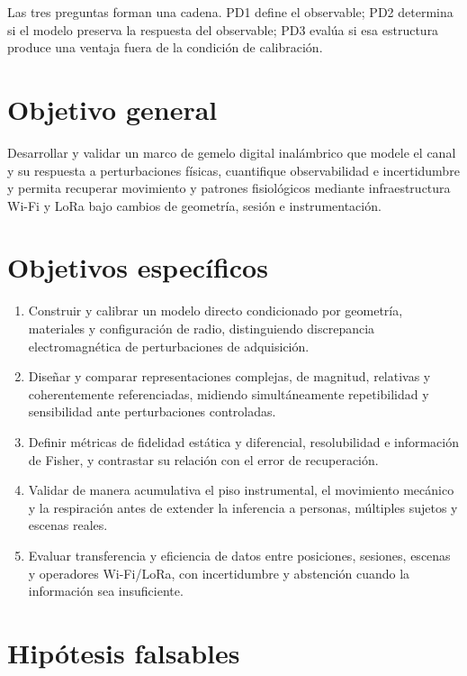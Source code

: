 Las tres preguntas forman una cadena. PD1 define el observable; PD2 determina si el modelo preserva la respuesta del observable; PD3 evalúa si esa estructura produce una ventaja fuera de la condición de calibración.

\section{Objetivo general}

Desarrollar y validar un marco de gemelo digital inalámbrico que modele el canal y su respuesta a perturbaciones físicas, cuantifique observabilidad e incertidumbre y permita recuperar movimiento y patrones fisiológicos mediante infraestructura Wi-Fi y LoRa bajo cambios de geometría, sesión e instrumentación.

\section{Objetivos específicos}

\begin{enumerate}[label=\textbf{O\arabic*:},leftmargin=3em]
\item Construir y calibrar un modelo directo condicionado por geometría, materiales y configuración de radio, distinguiendo discrepancia electromagnética de perturbaciones de adquisición.
\item Diseñar y comparar representaciones complejas, de magnitud, relativas y coherentemente referenciadas, midiendo simultáneamente repetibilidad y sensibilidad ante perturbaciones controladas.
\item Definir métricas de fidelidad estática y diferencial, resolubilidad e información de Fisher, y contrastar su relación con el error de recuperación.
\item Validar de manera acumulativa el piso instrumental, el movimiento mecánico y la respiración antes de extender la inferencia a personas, múltiples sujetos y escenas reales.
\item Evaluar transferencia y eficiencia de datos entre posiciones, sesiones, escenas y operadores Wi-Fi/LoRa, con incertidumbre y abstención cuando la información sea insuficiente.
\end{enumerate}

\section{Hipótesis falsables}
\label{sec:updated_hypotheses}

